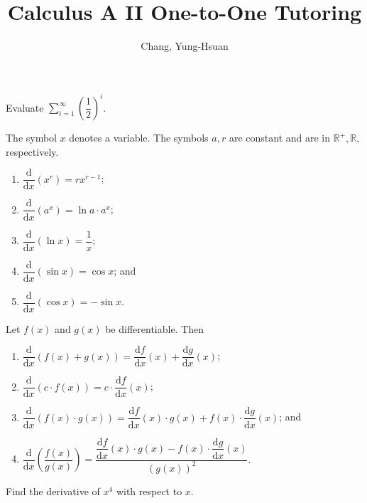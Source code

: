 \documentclass[11pt]{article}
\title{\textbf{Calculus A II One-to-One Tutoring}}
\author{Chang, Yung-Hsuan}
\theoremstyle{break}
\newcommand{\differentiate}[1]{\dfrac{\dd}{\dd{#1}}}
\newcommand{\derivative}[2]{\dfrac{\dd{#1}}{\dd{#2}}}
\newcommand{\dd}{\text{d}}
\newcommand{\bbR}{\mathbb{R}}
\numberwithin{equation}{theorem}
\begin{document}
\maketitle

\begin{question}
    Evaluate $\displaystyle\sum_{i=1}^\infty\left(\dfrac{1}{2}\right)^i$.
\end{question}

\begin{theorem}
    The symbol $x$ denotes a variable. The symbols $a, r$ are constant and are in $\bbR^+, \bbR$, respectively. \vspace{-1.8em}
    \begin{multicols}{2}
        \begin{enumerate}
            \item $\differentiate{x}\left(x^r\right)=rx^{r-1}$;
            \item $\differentiate{x}\left(a^x\right)=\ln a\cdot a^x$;
            \item $\differentiate{x}\left(\ln x\right)=\dfrac{1}{x}$;
            \item $\differentiate{x}(\sin x)=\cos x$; and
            \item $\differentiate{x}(\cos x)=-\sin x$.
        \end{enumerate}
    \end{multicols}
    \vspace{0.2em}
\end{theorem}

\begin{theorem}
    Let $f(x)$ and $g(x)$ be differentiable. Then
    \begin{enumerate}
        \item $\differentiate{x}\left(f(x)+g(x)\right)=\derivative{f}{x}(x)+\derivative{g}{x}(x)$;
        \item $\differentiate{x}\left(c\cdot f(x)\right)=c\cdot\derivative{f}{x}(x)$;
        \item $\differentiate{x}\left(f(x)\cdot g(x)\right)=\derivative{f}{x}(x)\cdot g(x)+f(x)\cdot\derivative{g}{x}(x)$; and 
        \item $\differentiate{x}\left(\dfrac{f(x)}{g(x)}\right)=\dfrac{\derivative{f}{x}(x)\cdot g(x)-f(x)\cdot\derivative{g}{x}(x)}{\left(g(x)\right)^2}$.
    \end{enumerate}
\end{theorem}

\begin{example}
    Find the derivative of $x^4$ with respect to $x$.
\end{example}
\vspace{8em}
\end{document}
